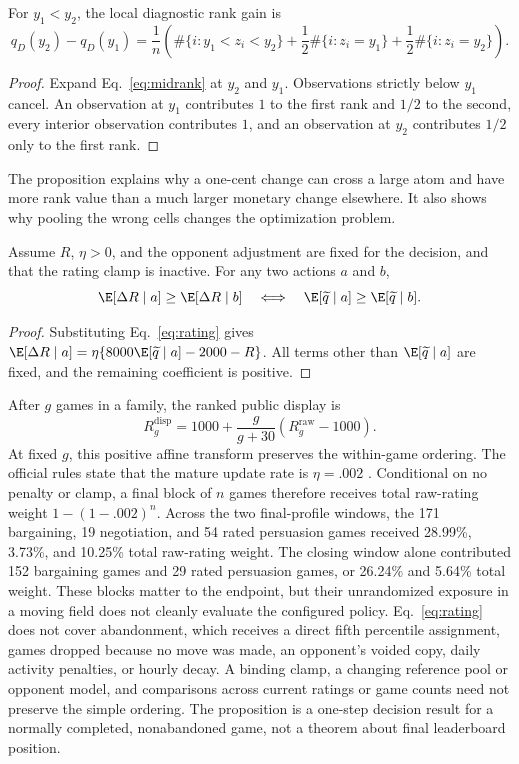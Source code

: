 \begin{proposition}
For $y_1<y_2$, the local diagnostic rank gain is
\begin{equation}
q_D(y_2)-q_D(y_1)=\frac{1}{n}\left(
\#\{i:y_1<z_i<y_2\}+\frac12\#\{i:z_i=y_1\}
+\frac12\#\{i:z_i=y_2\}\right).
\end{equation}
\end{proposition}
\begin{proof}
Expand Eq.~\eqref{eq:midrank} at $y_2$ and $y_1$. Observations strictly below
$y_1$ cancel. An observation at $y_1$ contributes $1$ to the first rank and
$1/2$ to the second, every interior observation contributes $1$, and an
observation at $y_2$ contributes $1/2$ only to the first rank.
\end{proof}

The proposition explains why a one-cent change can cross a large atom and have
more rank value than a much larger monetary change elsewhere. It also shows
why pooling the wrong cells changes the optimization problem.

\begin{proposition}
Assume $R$, $\eta>0$, and the opponent adjustment are fixed for the decision,
and that the rating clamp is inactive. For any two actions $a$ and $b$,
\[
\E[\Delta R\mid a]\geq \E[\Delta R\mid b]
\quad\Longleftrightarrow\quad
\E[\widetilde q\mid a]\geq \E[\widetilde q\mid b].
\]
\end{proposition}
\begin{proof}
Substituting Eq.~\eqref{eq:rating} gives
$\E[\Delta R\mid a]=\eta\{8000\E[\widetilde q\mid a]-2000-R\}$.
All terms other than $\E[\widetilde q\mid a]$ are fixed, and the remaining
coefficient is positive.
\end{proof}

After $g$ games in a family, the ranked public display is
\begin{equation}
R_g^{\mathrm{disp}}=1000+\frac{g}{g+30}
\left(R_g^{\mathrm{raw}}-1000\right).
\end{equation}
At fixed $g$, this positive affine transform preserves the within-game ordering.
The official rules state that the mature update rate is $\eta=.002$
\citep{gleecompetition2026}. Conditional on no penalty or clamp, a final block
of $n$ games therefore receives total raw-rating weight
$1-(1-.002)^n$. Across the two final-profile windows, the 171 bargaining, 19
negotiation, and 54 rated persuasion games received 28.99\%, 3.73\%, and
10.25\% total raw-rating weight. The closing window alone contributed 152
bargaining games and 29 rated persuasion games, or 26.24\% and 5.64\% total
weight. These blocks matter to the endpoint, but their unrandomized exposure in
a moving field does not cleanly evaluate the configured policy.
Eq.~\eqref{eq:rating} does not cover abandonment, which receives a direct fifth
percentile assignment, games dropped because no move was made, an opponent's
voided copy, daily activity penalties, or hourly decay. A binding clamp, a
changing reference pool or opponent model, and comparisons across current
ratings or game counts need not preserve the simple ordering. The proposition
is a one-step decision result for a normally completed, nonabandoned game, not a
theorem about final leaderboard position.

